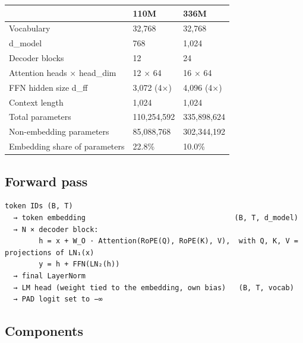 \documentclass[11pt]{article}
\begin{document}
\begin{center}
\small
\begin{tabular}{lll}
\toprule
 & \textbf{110M} & \textbf{336M} \\
\midrule
Vocabulary & 32,768 & 32,768 \\
d\_\allowbreak{}model & 768 & 1,024 \\
Decoder blocks & 12 & 24 \\
Attention heads × head\_\allowbreak{}dim & 12 × 64 & 16 × 64 \\
FFN hidden size d\_\allowbreak{}ff & 3,072 (4×) & 4,096 (4×) \\
Context length & 1,024 & 1,024 \\
Total parameters & 110,254,592 & 335,898,624 \\
Non-embedding parameters & 85,088,768 & 302,344,192 \\
Embedding share of parameters & 22.8\% & 10.0\% \\
\bottomrule
\end{tabular}
\end{center}

\subsection{Forward pass}

\begin{Verbatim}[fontsize=\footnotesize,frame=leftline,framesep=8pt,breaklines,breakanywhere=false,breaksymbolleft={}]
token IDs (B, T)
  → token embedding                                   (B, T, d_model)
  → N × decoder block:
        h = x + W_O · Attention(RoPE(Q), RoPE(K), V),  with Q, K, V = projections of LN₁(x)
        y = h + FFN(LN₂(h))
  → final LayerNorm
  → LM head (weight tied to the embedding, own bias)   (B, T, vocab)
  → PAD logit set to −∞
\end{Verbatim}

\subsection{Components}
\end{document}
